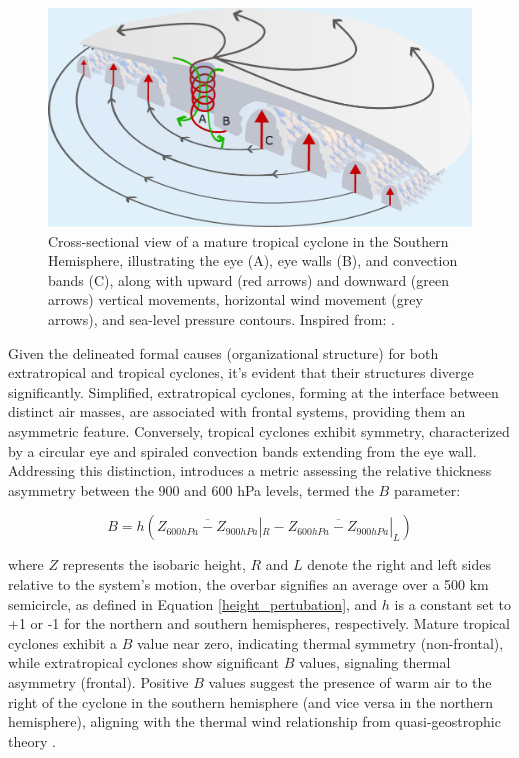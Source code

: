 \begin{figure}[h]
\begin{center}
\setcaptionmargin{1cm}
\includegraphics[width=0.7\columnwidth,angle=0]{fig/hurricane_cross_section.pdf}
\caption[Tropical Cyclone - Cross Section]{Cross-sectional view of a mature tropical cyclone in the Southern Hemisphere, illustrating the eye (A), eye walls (B), and convection bands (C), along with upward (red arrows) and downward (green arrows) vertical movements, horizontal wind movement (grey arrows), and sea-level pressure contours. Inspired from: \citet{bluestein1992synoptic}.} 
\label{hurricane_cross_section}
\end{center}
\end{figure}


Given the delineated formal causes (organizational structure) for both extratropical and tropical cyclones, it's evident that their structures diverge significantly. Simplified, extratropical cyclones, forming at the interface between distinct air masses, are associated with frontal systems, providing them an asymmetric feature. Conversely, tropical cyclones exhibit symmetry, characterized by a circular eye and spiraled convection bands extending from the eye wall. Addressing this distinction, \citet{hart2003cyclone} introduces a metric assessing the relative thickness asymmetry between the 900 and 600 hPa levels, termed the \(B\) parameter:


\begin{equation}
    B = h \left(\overline{Z_{600 hPa} - Z_{900 hPa}}|_R - \overline{Z_{600 hPa} - Z_{900 hPa}}|_L \right)
\end{equation}

where \(Z\) represents the isobaric height, \(R\) and \(L\) denote the right and left sides relative to the system's motion, the overbar signifies an average over a 500 km semicircle, as defined in Equation \ref{height_pertubation}, and \(h\) is a constant set to +1 or -1 for the northern and southern hemispheres, respectively. Mature tropical cyclones exhibit a \(B\) value near zero, indicating thermal symmetry (non-frontal), while extratropical cyclones show significant \(B\) values, signaling thermal asymmetry (frontal). Positive \(B\) values suggest the presence of warm air to the right of the cyclone in the southern hemisphere (and vice versa in the northern hemisphere), aligning with the thermal wind relationship from quasi-geostrophic theory \citep{sutcliffe1947contribution, trenberth1978interpretation}.

